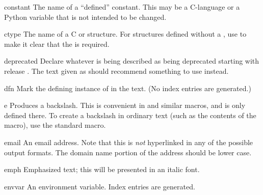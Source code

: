 \documentclass{howto}
\begin{document}
    \begin{macrodesc}{constant}{}
      The name of a ``defined'' constant.  This may be a C-language
       or a Python variable that is not intended to be
      changed.
    \end{macrodesc}

    \begin{macrodesc}{ctype}{}
      The name of a C  or structure.  For structures
      defined without a , use  to make it clear that the  is
      required.
    \end{macrodesc}

    \begin{macrodesc}{deprecated}{}
      Declare whatever is being described as being deprecated starting 
      with release .  The text given as 
      should recommend something to use instead.
    \end{macrodesc}

    \begin{macrodesc}{dfn}{}
      Mark the defining instance of  in the text.  (No index 
      entries are generated.)
    \end{macrodesc}

    \begin{macrodesc}{e}{}
      Produces a backslash.  This is convenient in  and
      similar macros, and is only defined there.  To create a
      backslash in ordinary text (such as the contents of the
       macro), use the standard  macro.
    \end{macrodesc}

    \begin{macrodesc}{email}{}
      An email address.  Note that this is \emph{not} hyperlinked in
      any of the possible output formats.  The domain name portion of
      the address should be lower case.
    \end{macrodesc}

    \begin{macrodesc}{emph}{}
      Emphasized text; this will be presented in an italic font.
    \end{macrodesc}

    \begin{macrodesc}{envvar}{}
      An environment variable.  Index entries are generated.
    \end{macrodesc}
\end{document}
